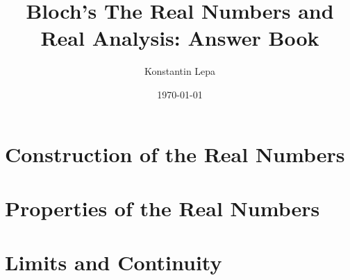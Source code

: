 \documentclass[reqno]{amsbook}
\title{Bloch's The Real Numbers and Real Analysis: Answer Book}
\author{Konstantin Lepa}
\date{\today}
\begin{document}
\begin{preview}

	\maketitle

	\Newpage
	\chapter{Construction of the Real Numbers}

	\Newpage
	

	\Newpage
	

	\Newpage
	

	\Newpage
	

	\Newpage
	

	\Newpage
	

	\Newpage
	


	\Newpage
	\chapter{Properties of the Real Numbers}

	\addtocounter{section}{1}

	\Newpage
	

	\Newpage
	

	\Newpage
	

	\Newpage
	

	\Newpage
	

	\Newpage
	

	\Newpage
	


	\Newpage
	\chapter{Limits and Continuity}


\end{preview}
\end{document}
